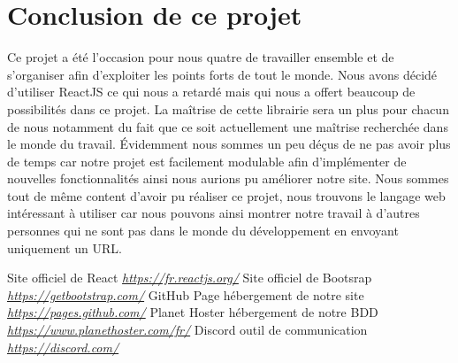 \documentclass[12pt]{report}
\begin{document}
\section{Conclusion de ce projet}
Ce projet a été l'occasion pour nous quatre de travailler ensemble et de s'organiser afin d'exploiter les points forts de tout le monde. Nous avons décidé d'utiliser ReactJS ce qui nous a retardé mais qui nous a offert beaucoup de possibilités dans ce projet. La maîtrise de cette librairie sera un plus pour chacun de nous notamment du fait que ce soit actuellement une maîtrise recherchée dans le monde du travail. Évidemment nous sommes un peu déçus de ne pas avoir plus de temps car notre projet est facilement modulable afin d'implémenter de nouvelles fonctionnalités ainsi nous aurions pu améliorer notre site. Nous sommes tout de même content d'avoir pu réaliser ce projet, nous trouvons le langage web intéressant à utiliser car nous pouvons ainsi montrer notre travail à d'autres personnes qui ne sont pas dans le monde du développement en envoyant uniquement un URL. 
\clearpage

			\begin{thebibliography}{10}
			Site officiel de React
			\emph{\href{https://fr.reactjs.org/}{https://fr.reactjs.org/}}
			Site officiel de Bootsrap
			\emph{\href{https://getbootstrap.com/}{https://getbootstrap.com/}}
			GitHub Page hébergement de notre site
			\emph{\href{https://pages.github.com/}{https://pages.github.com/}} 
			Planet Hoster hébergement de notre BDD
			\emph{\href{https://www.planethoster.com/fr/}{https://www.planethoster.com/fr/}}
			Discord outil de communication
			\emph{\href{https://discord.com/}{https://discord.com/}}
		\end{thebibliography}
\end{document}

